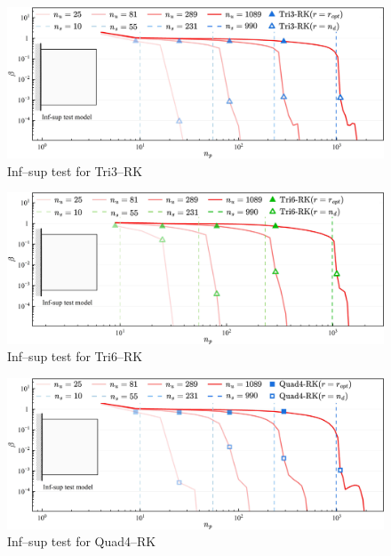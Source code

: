 \begin{figure}[H]
\centering
\includegraphics[width=\textwidth]{pdf/tri3.pdf}
\caption{Inf--sup test for Tri3--RK}\label{fg:infsup_convergence_2D_a}
\end{figure}

\begin{figure}[H]
\centering
\includegraphics[width=\textwidth]{pdf/tri6.pdf}\caption{Inf--sup test for Tri6--RK}\label{fg:infsup_convergence_2D_b}
\end{figure}

\begin{figure}[H]
\centering
\includegraphics[width=\textwidth]{pdf/quad4.pdf}\caption{Inf--sup test for Quad4--RK}\label{fg:infsup_convergence_2D_c}
\end{figure}

